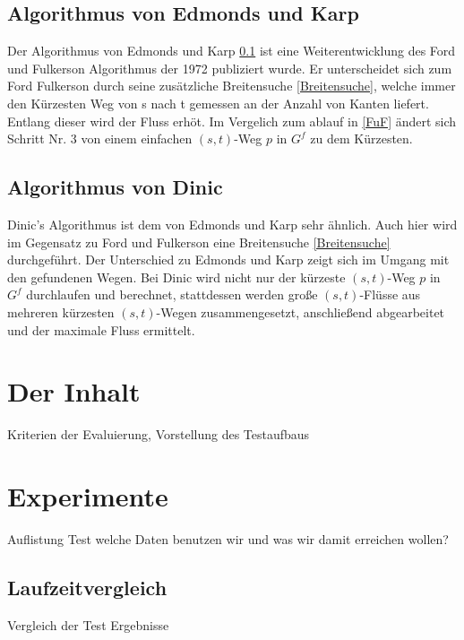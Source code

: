 \documentclass[a4paper]{llncs}
\begin{document}
\subsection{Algorithmus von Edmonds und Karp}
\label{EuK}
Der Algorithmus von Edmonds und Karp \ref{EuK} ist eine Weiterentwicklung des Ford und Fulkerson Algorithmus der 1972 publiziert wurde.
Er unterscheidet sich zum Ford Fulkerson durch seine zusätzliche Breitensuche \ref{Breitensuche},
welche immer den Kürzesten Weg von s nach t gemessen an der Anzahl von Kanten liefert. 
Entlang dieser wird der Fluss erhöt.
Im Vergelich zum ablauf in \ref{FuF} ändert sich Schritt Nr. 3 von einem einfachen $(s, t)$-Weg $p$ in $G^{f}$ zu dem Kürzesten.

\subsection{Algorithmus von Dinic}
\label{Dinic}
Dinic's Algorithmus ist dem von Edmonds und Karp sehr ähnlich. Auch hier wird im Gegensatz zu Ford und Fulkerson eine Breitensuche \ref{Breitensuche} durchgeführt. Der Unterschied zu Edmonds und Karp zeigt sich im Umgang mit den gefundenen Wegen. Bei Dinic wird nicht nur der kürzeste $(s, t)$-Weg $p$ in $G^{f}$ durchlaufen und berechnet, stattdessen werden große $(s, t)$-Flüsse aus mehreren kürzesten $(s, t)$-Wegen zusammengesetzt, anschließend abgearbeitet und der maximale Fluss ermittelt.

\section{Der Inhalt}
\label{Inhalt}
Kriterien der Evaluierung, Vorstellung des Testaufbaus
\section{Experimente}
\label{Experimente}
Auflistung Test welche Daten benutzen wir und was wir damit erreichen wollen?

\subsection{Laufzeitvergleich}
Vergleich der Test Ergebnisse
\end{document}
